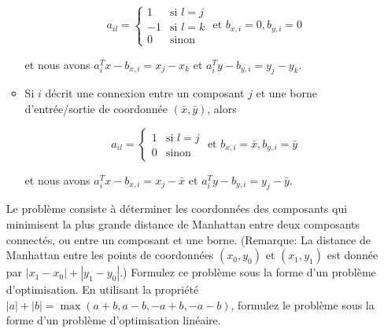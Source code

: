 \begin{enumerate}
\begin{itemize}
        $$a_{il}=
        \left\{
          \begin{array}{rl}
            1 & \mbox{si } l=j\\
            -1 & \mbox{si } l=k\\
            0 & \mbox{sinon}
          \end{array}
        \right.
        \mbox{ et }
        b_{x, i}=0, b_{y,i}=0
        $$

        et nous avons  $a_i^Tx-b_{x,i}=x_j-x_k$ et $a_i^Ty-b_{y,i}=y_j-y_k.$

      \item Si $i$ décrit une connexion entre un composant $j$ et une borne d'entrée/sortie de coordonnée $(\bar x, \bar y)$, alors

        $$a_{il}=
        \left\{
          \begin{array}{rll}
            1 & \mbox{si } l=j\\
            0 & \mbox{sinon}
          \end{array}
        \right.
        \mbox{ et }
        b_{x, i}=\bar x, b_{y,i}=\bar y
        $$

        et nous avons $a_i^Tx-b_{x,i}=x_j-\bar x$ et $a_i^Ty-b_{y,i}=y_j-\bar y.$

    \end{itemize}

    Le problème consiste à déterminer les coordonnées des composants qui minimisent
    la plus grande distance de Manhattan
    entre deux composants connectés, ou entre un composant et une borne. (Remarque: La distance de Manhattan entre les
    points de coordonnées
    $(x_0, y_0)$ et
    $(x_1, y_1)$ est donnée par
    $|x_1-x_0|+|y_1-y_0|$.) Formulez ce problème sous la forme d'un problème
    d'optimisation. En utilisant la propriété
    $|a|+|b|=\max(a+b, a-b, -a+b, -a-b)$, formulez le problème sous la
    forme d'un problème d'optimisation linéaire.

    \begin{solution}

    \end{solution}

\end{enumerate}
